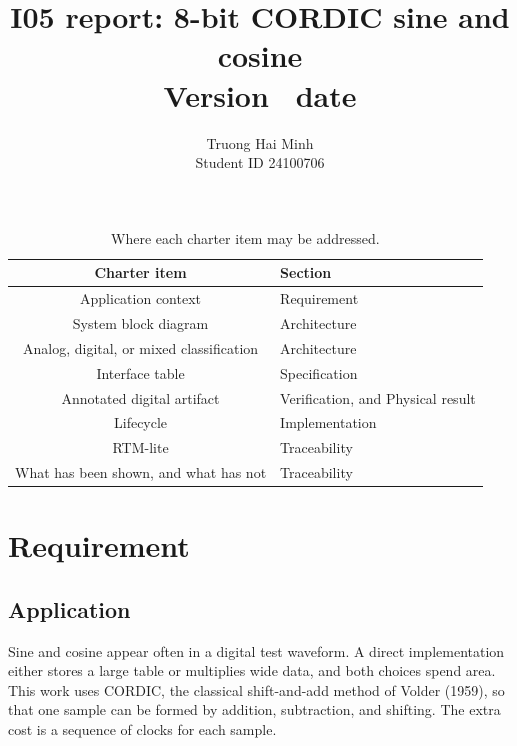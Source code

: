 \documentclass[11pt,a4paper]{article}
\title{I05 report: 8-bit CORDIC sine and cosine\\
\large Version \textperiodcentered\ date}
\author{Truong Hai Minh\\Student ID 24100706}
\date{}
\begin{document}
\maketitle


\begin{table}[H]
  \centering
  \caption{Where each charter item may be addressed.}
  \begin{tabular}{@{}cl@{}}
    \toprule
    Charter item & Section \\
    \midrule
    Application context & Requirement \\
    System block diagram & Architecture \\
    Analog, digital, or mixed classification & Architecture \\
    Interface table & Specification \\
    Annotated digital artifact & Verification, and Physical result \\
    Lifecycle & Implementation \\
    RTM-lite & Traceability \\
    What has been shown, and what has not & Traceability \\
    \bottomrule
  \end{tabular}
\end{table}

\tableofcontents

\section{Requirement}

\subsection{Application}
Sine and cosine appear often in a digital test waveform. A direct implementation either stores a large table or multiplies wide data, and both choices spend area. This work uses CORDIC, the classical shift-and-add method of Volder (1959), so that one sample can be formed by addition, subtraction, and shifting. The extra cost is a sequence of clocks for each sample.
\end{document}
